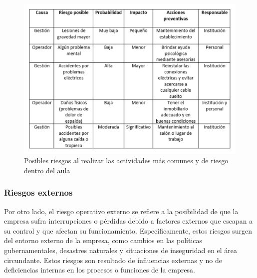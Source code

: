     \begin{figure}[H]
        \centering
        \includegraphics[scale=0.25]{30/img/Posibles riesgos int.pdf}
        \caption{Posibles riesgos al realizar las actividades más comunes y de riesgo dentro del aula}
    \end{figure}
    \subsubsection{Riesgos externos}
    Por otro lado, el riesgo operativo externo se refiere a la posibilidad de que la empresa sufra interrupciones o pérdidas debido a factores externos que escapan a su control y que afectan su funcionamiento. Específicamente, estos riesgos surgen del entorno externo de la empresa, como cambios en las políticas gubernamentales, desastres naturales y situaciones de inseguridad en el área circundante. Estos riesgos son resultado de influencias externas y no de deficiencias internas en los procesos o funciones de la empresa.
    
